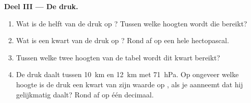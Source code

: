 \begin{problem}
\noindent\textbf{Deel III --- De druk.}\par\nopagebreak
\begin{enumerate}[resume, beginpenalty=10000]
  \item Wat is de helft van de druk op ? Tussen welke hoogten
        wordt die bereikt?
  \item Wat is een kwart van de druk op ? Rond af op een hele
        hectopascal.
  \item Tussen welke twee hoogten van de tabel wordt dit kwart bereikt?
  \item De druk daalt tussen \qty{10}{km} en \qty{12}{km} met
        \qty{71}{hPa}. Op ongeveer welke hoogte is de druk een kwart van
        zijn waarde op , als je aanneemt dat hij gelijkmatig daalt?
        Rond af op één decimaal.
\end{enumerate}
\end{problem}
